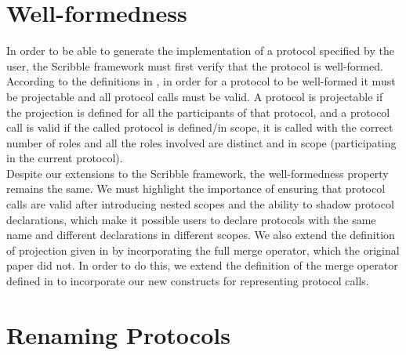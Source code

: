 \documentclass[12pt,twoside]{report}
\begin{document}
\section{Well-formedness}
In order to be able to generate the implementation of a protocol specified by the user, the Scribble framework must first verify that the protocol is well-formed.\\ According to the definitions in \cite{featherweight, nestedprotocols}, in order for a protocol to be well-formed it must be projectable and all protocol calls must be valid. A protocol is projectable if the projection is defined for all the participants of that protocol, and a protocol call is valid if the called protocol is defined/in scope, it is called with the correct number of roles and all the roles involved are distinct and in scope (participating in the current protocol).\\

Despite our extensions to the Scribble framework, the well-formedness property remains the same. We must highlight the importance of ensuring that protocol calls are valid after introducing nested scopes and the ability to shadow protocol declarations, which make it possible users to declare protocols with the same name and different declarations in different scopes. We also extend the definition of projection given in \cite{nestedprotocols} by incorporating the full merge operator, which the original paper did not. In order to do this, we extend the definition of the merge operator defined in \cite{featherweight} to incorporate our new constructs for representing protocol calls.


\section{Renaming Protocols}\label{renaming}
\end{document}
